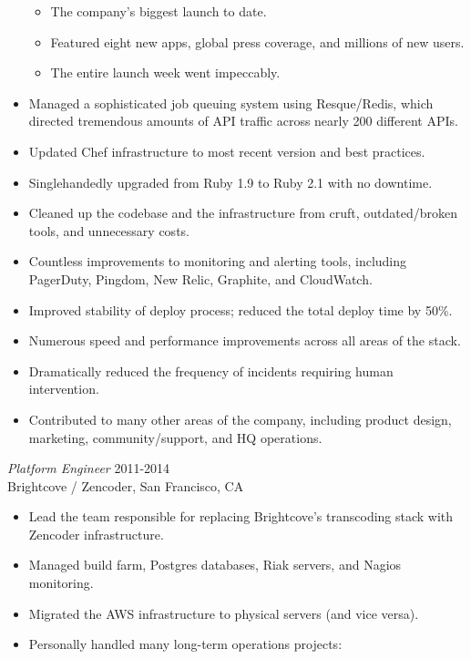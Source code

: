 \documentclass[line,margin]{res}
\begin{document}
\begin{resume}
\begin{itemize}
    \vspace{-2.5mm} %
    \begin{itemize}  \itemsep -3pt %
      \item The company's biggest launch to date.
      \item Featured eight new apps, global press coverage, and millions of new users. 
      \item The entire launch week went impeccably.
    \end{itemize}
    \vspace{-2.0mm} %

    \item Managed a sophisticated job queuing system using Resque/Redis, which directed tremendous amounts of API traffic across nearly 200 different APIs.
    \item Updated Chef infrastructure to most recent version and best practices.
    \item Singlehandedly upgraded from Ruby 1.9 to Ruby 2.1 with no downtime.
    \item Cleaned up the codebase and the infrastructure from cruft, outdated/broken tools, and unnecessary costs.
    \item Countless improvements to monitoring and alerting tools, including PagerDuty, Pingdom, New Relic, Graphite, and CloudWatch.
    \item Improved stability of deploy process; reduced the total deploy time by 50\%.
    \item Numerous speed and performance improvements across all areas of the stack.
    \item Dramatically reduced the frequency of incidents requiring human intervention.
    \item Contributed to many other areas of the company, including product design, marketing, community/support, and HQ operations.
  \end{itemize}

  {\sl Platform Engineer}  \hfill 2011-2014 \\
  Brightcove / Zencoder,
  San Francisco, CA
  \begin{itemize}  \itemsep -2pt %
    \item Lead the team responsible for replacing Brightcove's transcoding stack with Zencoder infrastructure.
    \item Managed build farm, Postgres databases, Riak servers, and Nagios monitoring.
    \item Migrated the AWS infrastructure to physical servers (and vice versa).
    \item Personally handled many long-term operations projects:


\end{itemize}
\end{resume}
\end{document}
